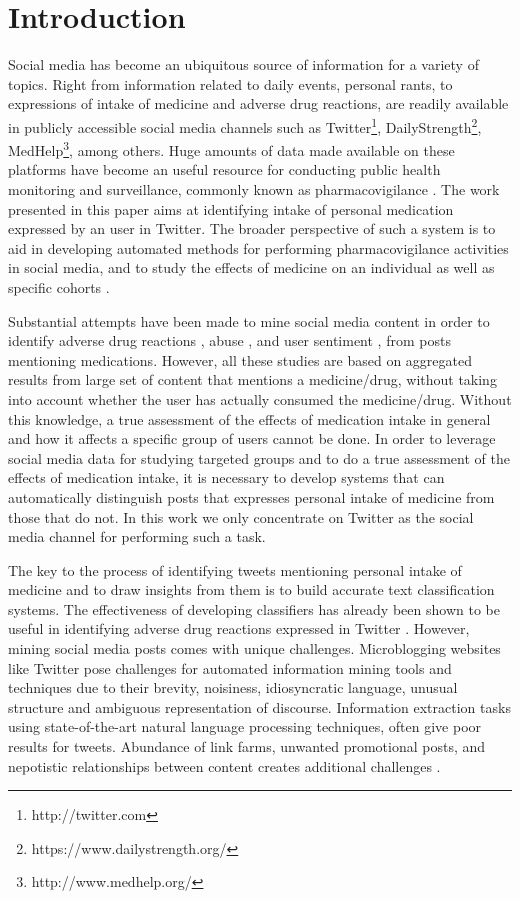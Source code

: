 \documentclass[conference]{IEEEtran}
\begin{document}
\section{Introduction}
Social media has become an ubiquitous source of information for a variety of topics. Right from information related to daily events, personal rants, to expressions of intake of medicine and adverse drug reactions, are readily available in publicly accessible social media channels such as Twitter\footnote{http://twitter.com}, DailyStrength\footnote{https://www.dailystrength.org/}, MedHelp\footnote{http://www.medhelp.org/}, among others. Huge amounts of data made available on these platforms have become an useful resource for conducting public health monitoring and surveillance, commonly known as pharmacovigilance \cite{harmark2008pharmacovigilance}. The work presented in this paper aims at identifying intake of personal medication expressed by an user in Twitter. The broader perspective of such a system is to aid in developing automated methods for performing pharmacovigilance activities in social media, and to study the effects of medicine on an individual as well as specific cohorts \cite{klein2017detecting}.

Substantial attempts have been made to mine social media content in order to identify adverse drug reactions \cite{nikfarjam2015pharmacovigilance}, abuse \cite{hanson2013tweaking}, and user sentiment \cite{korkontzelos2016analysis}, from posts mentioning medications. However, all these studies are based on aggregated results from large set of content that mentions a medicine/drug, without taking into account whether the user has actually consumed the medicine/drug. Without this knowledge, a true assessment of the effects of medication intake in general and how it affects a specific group of users cannot be done. In order to leverage social media data for studying targeted groups and to do a true assessment of the effects of medication intake, it is necessary to develop systems that can automatically distinguish posts that expresses personal intake of medicine from those that do not. In this work we only concentrate on Twitter as the social media channel for performing such a task.

The key to the process of identifying tweets mentioning personal intake of medicine and to draw insights from them is to build accurate text classification systems. The effectiveness of developing classifiers has already been shown to be useful in identifying adverse drug reactions expressed in Twitter \cite{nikfarjam2015pharmacovigilance}. However, mining social media posts comes with unique challenges. Microblogging websites like Twitter pose challenges for automated information mining tools and techniques due to their brevity, noisiness, idiosyncratic language, unusual structure and ambiguous representation of discourse. Information extraction tasks using state-of-the-art natural language processing techniques, often give poor results for tweets. Abundance of link farms, unwanted promotional posts, and nepotistic relationships between content creates additional challenges \cite{mahata2015chirps}.
\end{document}
